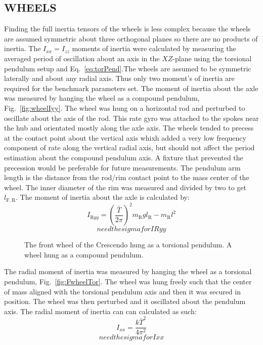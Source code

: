 \documentclass{bmd2010p}
\begin{document}
\subsection{WHEELS}
Finding the full inertia tensors of the wheels is less complex because the wheels
are assumed symmetric about three orthogonal planes so there are no products of
inertia. The $I_{xx}=I_{zz}$ moments of inertia were calculated by measuring
the averaged period of oscillation about an axis in the $XZ$-plane using the
torsional pendulum setup and Eq.~\ref{eq:torPend}.The wheels are assumed to be symmetric laterally and about any radial axis. Thus only two
moment's of inertia are required for the benchmark parameters set. The moment
of inertia about the axle was measured by hanging the wheel as a compound
pendulum, Fig.~\ref{fig:wheelIyy}. The wheel was hung on a
horizontal rod and perturbed to oscillate about the axis of the rod. This rate
gyro was attached to the spokes near the hub and orientated mostly along the
axle axis. The wheels tended to precess at the contact point about the vertical
axis whixh added a very low frequency component of rate along the vertical
radial axis, but should not affect the period estimation about the compound
pendulum axis. A fixture that prevented the precession would be preferable for
future measurements. The pendulum arm length is the distance
from the rod/rim contact point to the mass center of the wheel. The inner
diameter of the rim was measured and divided by two to get $l_\mathrm{F,R}$. The moment of
inertia about the axle is calculated by:
\begin{equation}
    I_{\mathrm{R}yy} = \left(\frac{\bar{T}}{2\pi}\right)^2m_\mathrm{R}gl_\mathrm{R} -
    m_\mathrm{R}l^2
    \label{eq:CompoundInertia}
\end{equation}
\begin{equation}
    need the sigma for IRyy
\end{equation}
\begin{figure}[tbp]
    \centering
    \quad
    \caption{ The front wheel of the Crescendo hung as a
    torsional pendulum.  A wheel hung as a compound pendulum.}
    \label{fig:wheelPend}
\end{figure}
The radial moment of inertia was measured by hanging the wheel as a torsional
pendulum, Fig.~\ref{fig:FwheelTor}. The wheel was hung freely such that the center of mass aligned with
the torsional pendulum axis and then it was secured in position. The wheel was then
perturbed and it oscillated about the pendulum axis. The radial moment of inertia can can calculated as such:
\begin{equation}
    I_{xx} = \frac{k\bar{T}^2}{4\pi^2}
\end{equation}
\begin{equation}
    need the sigma for Ixx
\end{equation}
\end{document}
